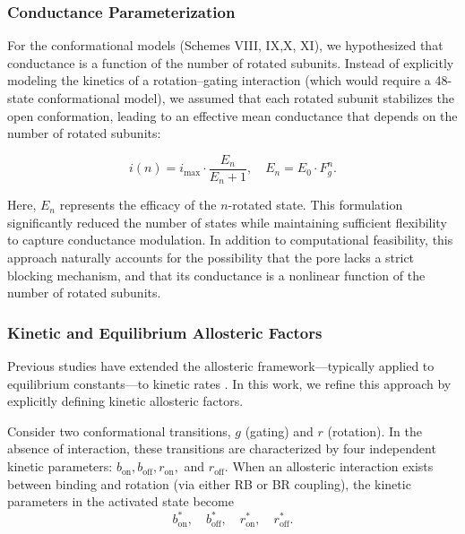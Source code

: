 \documentclass[9pt]{elife}
\begin{document}
	\subsubsection{Conductance Parameterization}
	
	For the conformational models (Schemes VIII, IX,X, XI), we hypothesized that conductance is a function of the number of rotated subunits. Instead of explicitly modeling the kinetics of a rotation–gating interaction (which would require a 48-state conformational model), we assumed that each rotated subunit stabilizes the open conformation, leading to an effective mean conductance that depends on the number of rotated subunits:
	
	\[
	i(n) = i_{\text{max}} \cdot \frac{E_n}{E_n + 1}, \quad E_n = E_0 \cdot F_g^n.
	\]
	
	Here, \( E_n \) represents the efficacy of the \( n \)-rotated state. This formulation significantly reduced the number of states while maintaining sufficient flexibility to capture conductance modulation. In addition to computational feasibility, this approach naturally accounts for the possibility that the pore lacks a strict blocking mechanism, and that its conductance is a nonlinear function of the number of rotated subunits.
	
	\subsubsection{Kinetic and Equilibrium Allosteric Factors}
	
	Previous studies have extended the allosteric framework—typically applied to equilibrium constants—to kinetic rates \cite{Moffatt_hume}. In this work, we refine this approach by explicitly defining kinetic allosteric factors.
	
	Consider two conformational transitions, \(g\) (gating) and \(r\) (rotation). In the absence of interaction, these transitions are characterized by four independent kinetic parameters: \(b_{\text{on}}, b_{\text{off}}, r_{\text{on}},\) and \(r_{\text{off}}\). When an allosteric interaction exists between binding and rotation (via either RB or BR coupling), the kinetic parameters in the activated state become
	\[
	b^*_{\text{on}},\quad b^*_{\text{off}},\quad r^*_{\text{on}},\quad r^*_{\text{off}}.
	\]
	
\end{document}
